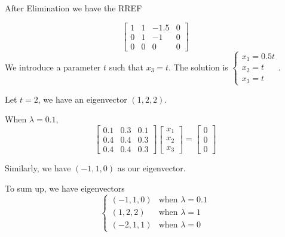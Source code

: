 \documentclass[12pt,a4paper]{article}
\begin{document}
\begin{solution}
After Elimination we have the RREF

\[
\left[\begin{array}{ccc|c}
1 & 1 & -1.5 & 0 \\
0 & 1 & -1& 0\\
0 & 0 & 0 & 0
\end{array}
\right]
\]
We introduce a parameter $t$ such that $x_3 = t$.
The solution is 
$\begin{cases}
x_1 = 0.5t\\
x_2 = t\\
x_3 = t
\end{cases}$.

Let $t = 2$, we have an eigenvector $(1, 2, 2)$.


When $\lambda = 0.1$,
$$
\left[\begin{array}{ccc}
0.1 & 0.3 & 0.1 \\
0.4 & 0.4 & 0.3 \\
0.4 & 0.4 & 0.3
\end{array}\right]\left[\begin{array}{l}
x_1 \\
x_2 \\
x_3
\end{array}\right]=\left[\begin{array}{l}
0 \\
0 \\
0
\end{array}\right]
$$

Similarly, we have $(-1, 1, 0)$ as our eigenvector.

To sum up, we have eigenvectors
\[
\begin{cases}
    (-1, 1, 0)& \text{when }\lambda = 0.1\\
    (1, 2, 2)& \text{when }\lambda = 1\\
    (-2, 1, 1)& \text{when }\lambda = 0
\end{cases}
\]
\end{solution}
\end{document}
